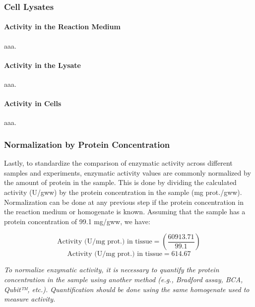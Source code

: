 \documentclass[
  9pt,
  american,
  a5paper,
  extrafontsizes,onecolumn,openright
  ]{memoir}
\begin{document}
\subsubsection{Cell Lysates}\label{cell-lysates}

\paragraph{Activity in the Reaction Medium}\label{activity-in-the-reaction-medium-1}

aaa.

\paragraph{Activity in the Lysate}\label{activity-in-the-lysate}

aaa.

\paragraph{Activity in Cells}\label{activity-in-cells}

aaa.

\subsubsection{Normalization by Protein Concentration}\label{normalization-by-protein-concentration}

Lastly, to standardize the comparison of enzymatic activity across different samples and experiments, enzymatic activity values are commonly normalized by the amount of protein in the sample. This is done by dividing the calculated activity (U/gww) by the protein concentration in the sample (mg prot./gww). Normalization can be done at any previous step if the protein concentration in the reaction medium or homogenate is known. Assuming that the sample has a protein concentration of 99.1 mg/gww, we have:

\[ \text{Activity (U/mg prot.) in tissue} = \left( \frac{60913.71}{99.1} \right)\]
\[ \text{Activity (U/mg prot.) in tissue} = 614.67 \]

\begin{greybox}[frametitle = Note]
\emph{To normalize enzymatic activity, it is necessary to quantify the protein concentration in the sample using another method (e.g., Bradford assay, BCA, Qubit™, etc.). Quantification should be done using the same homogenate used to measure activity.}

\end{greybox}
\end{document}

